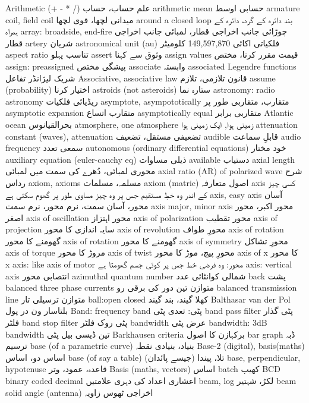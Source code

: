 Arithmetic (+ -  * /)	علم حساب، حساب
arithmetic mean	حسابی اوسط
armature coil, field coil	میدانی لچھا، قوی لچھا
around a closed loop	بند دائرہ کے گرد، دائرہ کے ہمراہ
array: broadside, end-fire	چوڑائی جانب اخراجی قطار، لمبائی جانب اخراجی قطار
artery	شریان
astronomical unit (au)	فلکیاتی اکائی   149,597,870  کلومیٹر
aspect ratio	تناسب پہلو
assert	وثوق سے کہنا
assign values	قیمت مقرر کرنا، مختص
assign: preassigned	پیشگی مختص
associate	وابستہ
associated Legendre functions	شریک لیژانڈر تفاعل
Associative, associative law	قانون تلازمی، تلازم
assume (probability)	اختیار کرنا
astroids (not asteroids)	ستارہ نما
astronomy: radio astronomy	ریڈیائی فلکیات
asymptote, asympototically	متقارب، متقاربی طور پر
asymptotic expansion	متقارب اتساع
asymptotically equal	متقاربی برابر
Atlantic ocean	بحرالقیانوس
atmosphere, one atmosphere	زمینی ہوا, ایک زمینی ہوا
attenuation constant (waves), attenuation	تضعیفی مستقل، تضعیف
audible	قابلِ سماعت
audio frequency	سمعی تعدد
autonomous (ordinary differential equations)	خود مختار
auxiliary equation (euler-cauchy eq)	ذیلی مساوات
available	دستیاب
axial length	محوری لمبائی، دُھرے کی سمت میں لمبائی
axial ratio (AR) of polarized wave	شرح رداس
axiom, axioms	مسلمہ، مسلمات
axiom (matric)	اصول متعارفہ
axis	کسی چیز کے اندر وہ خطِ مستقیم جس پر وہ چیز مساوی طور پر گھوم سکتی ہے
axis, easy axis	آسان محور، آسان سمت، نرم محور، نرم سمت
axis major, minor axis	محور اکبر، محور اصغر
axis of oscillation	محور اہتزاز
axis of polarization	محور تقطیب
axis of projection	سایہ اندازی کا محور
axis of revolution	محورِ طواف
axis of rotation	گھومنے کا محور
axis of rotation	گھومنے کا محور
axis of symmetry	محورِ تشاکل
axis of torque	مروڑ کا محور
axis of twist	محورِ پیچ، موڑ کا محور
axis of x	 کا محور x
axis: like axis of motor	محور: وہ فرضی خط جس پر کوئی جسم  گھومتا ہے
axis: vertical axis	انتصابی محور
azimuthal quantum number	 شمالی کوانٹائی عدد
back	پشت
balanced three phase currents	متوازن تین دور کی برقی رو
balanced transmission line	متوازن ترسیلی تار
ball:open closed	کھلا گیند، بند گیند
Balthasar van der Pol	بلتاسار ون در پول
Band: frequency band	پٹی: تعدی پٹی
band pass filter	پٹی گذار فلٹر
band stop filter	پٹی روک فلٹر
bandwidth	عرض پٹی
bandwidth: 3dB bandwidth	تین ڈیسی بیل  پٹی
Barkhausen criteria	برکہازن کا اصول
bar graph	ڈبہ ترسیم
base (of a parametric curve)	بنیاد، بنیادی نقطہ
Base-2 (digital), basis(maths)	اساس دو، اساس
base (of say a table)	تلا،  پیندا (جیسے پائدان)
base, perpendicular, hypotenuse	قاعدہ، عمود، وتر
Basis (maths, vectors)	اساس
batch	کھیپ
BCD binary coded decimal	اعشاری اعداد کی دہری علامتیں
beam, log	لکڑ، شہتیر
beam solid angle (antenna)	اخراجی ٹھوس زاویہ
